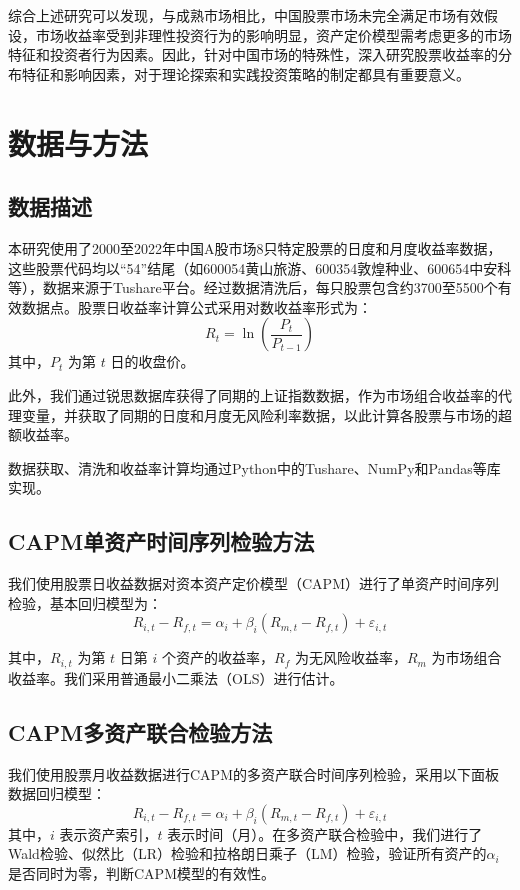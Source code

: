 \documentclass[12pt, a4paper]{article}
\begin{document}
综合上述研究可以发现，与成熟市场相比，中国股票市场未完全满足市场有效假设，市场收益率受到非理性投资行为的影响明显，资产定价模型需考虑更多的市场特征和投资者行为因素。因此，针对中国市场的特殊性，深入研究股票收益率的分布特征和影响因素，对于理论探索和实践投资策略的制定都具有重要意义。

\section{数据与方法}

\subsection{数据描述}

本研究使用了2000至2022年中国A股市场8只特定股票的日度和月度收益率数据，这些股票代码均以“54”结尾（如600054黄山旅游、600354敦煌种业、600654中安科等），数据来源于Tushare平台。经过数据清洗后，每只股票包含约3700至5500个有效数据点。股票日收益率计算公式采用对数收益率形式为：
\begin{equation}
R_{t} = \ln\left(\frac{P_{t}}{P_{t-1}}\right)
\end{equation}
其中，$P_t$ 为第 $t$ 日的收盘价。

此外，我们通过锐思数据库获得了同期的上证指数数据，作为市场组合收益率的代理变量，并获取了同期的日度和月度无风险利率数据，以此计算各股票与市场的超额收益率。

数据获取、清洗和收益率计算均通过Python中的Tushare、NumPy和Pandas等库实现。

\subsection{CAPM单资产时间序列检验方法}

我们使用股票日收益数据对资本资产定价模型（CAPM）进行了单资产时间序列检验，基本回归模型为：
\begin{equation}
R_{i,t}-R_{f,t} = \alpha_i + \beta_i (R_{m,t}-R_{f,t}) + \varepsilon_{i,t}
\end{equation}

其中，$R_{i,t}$ 为第 $t$ 日第 $i$ 个资产的收益率，$R_f$ 为无风险收益率，$R_m$ 为市场组合收益率。我们采用普通最小二乘法（OLS）进行估计。

\subsection{CAPM多资产联合检验方法}

我们使用股票月收益数据进行CAPM的多资产联合时间序列检验，采用以下面板数据回归模型：
\begin{equation}
R_{i,t}-R_{f,t} = \alpha_i + \beta_i(R_{m,t}-R_{f,t}) + \varepsilon_{i,t}
\end{equation}
其中，$i$ 表示资产索引，$t$ 表示时间（月）。在多资产联合检验中，我们进行了Wald检验、似然比（LR）检验和拉格朗日乘子（LM）检验，验证所有资产的$\alpha_i$是否同时为零，判断CAPM模型的有效性。
\end{document}
